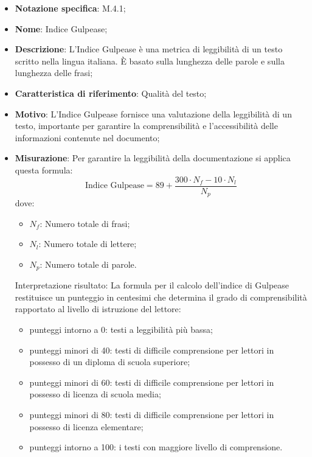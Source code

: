 \begin{itemize}
    \item \textbf{Notazione specifica}: M.4.1;
    \item \textbf{Nome}: Indice Gulpease;
    \item \textbf{Descrizione}: L'Indice Gulpease è una metrica di leggibilità di un testo scritto nella lingua italiana. È basato sulla lunghezza delle parole e sulla lunghezza delle frasi;
    \item \textbf{Caratteristica di riferimento}: Qualità del testo;
    \item \textbf{Motivo}: L'Indice Gulpease fornisce una valutazione della leggibilità di un testo, importante per garantire la comprensibilità e l'accessibilità delle informazioni contenute nel documento;
    \item \textbf{Misurazione}: Per garantire la leggibilità della documentazione si applica questa formula:
    \[
        \text{Indice Gulpease} =89 + \frac{{300 \cdot {{N_f}} - 10 \cdot {{N_l}}}}{{{{N_p}}}}
    \]
    dove:
    \begin{itemize}
        \item $N_{f}$: Numero totale di frasi;
        \item $N_{l}$: Numero totale di lettere;
        \item $N_{p}$: Numero totale di parole.
        
    \end{itemize}
    Interpretazione risultato: La formula per il calcolo dell’indice di Gulpease restituisce un punteggio in centesimi che determina il grado di comprensibilità rapportato al livello di istruzione del lettore:
    \begin{itemize}
        \item punteggi intorno a 0: testi a leggibilità più bassa;
        \item punteggi minori di 40: testi di difficile comprensione per lettori in possesso di un diploma di scuola superiore;
        \item punteggi minori di 60: testi di difficile comprensione per lettori in possesso di licenza di scuola media;
        \item punteggi minori di 80: testi di difficile comprensione per lettori in possesso di licenza elementare;
        \item punteggi intorno a 100: i testi con maggiore livello di comprensione.
    \end{itemize}
\end{itemize}
